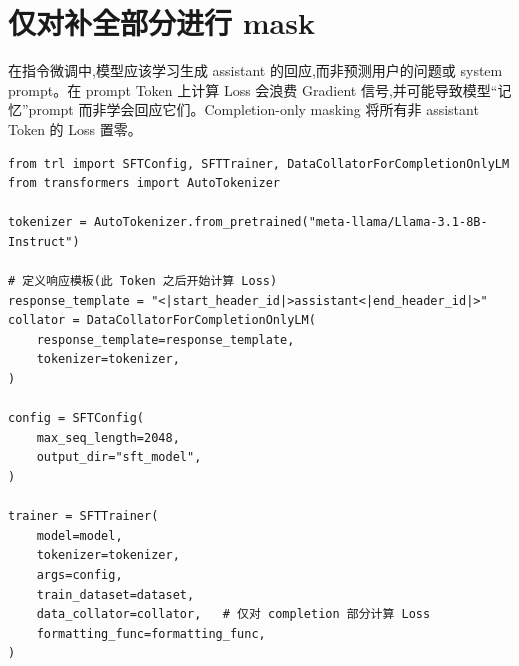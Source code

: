 \section{仅对补全部分进行 mask}
\label{sec:completion-masking}

\begin{intuitionbox}[为何要 mask prompt?]
在指令微调中,模型应该学习生成 assistant 的回应,而非预测用户的问题或 system prompt。在 prompt Token 上计算 Loss 会浪费 Gradient 信号,并可能导致模型“记忆”prompt 而非学会回应它们。Completion-only masking 将所有非 assistant Token 的 Loss 置零。
\end{intuitionbox}

\begin{examplebox}
\begin{lstlisting}[style=pythonstyle]
from trl import SFTConfig, SFTTrainer, DataCollatorForCompletionOnlyLM
from transformers import AutoTokenizer

tokenizer = AutoTokenizer.from_pretrained("meta-llama/Llama-3.1-8B-Instruct")

# 定义响应模板(此 Token 之后开始计算 Loss)
response_template = "<|start_header_id|>assistant<|end_header_id|>"
collator = DataCollatorForCompletionOnlyLM(
    response_template=response_template,
    tokenizer=tokenizer,
)

config = SFTConfig(
    max_seq_length=2048,
    output_dir="sft_model",
)

trainer = SFTTrainer(
    model=model,
    tokenizer=tokenizer,
    args=config,
    train_dataset=dataset,
    data_collator=collator,   # 仅对 completion 部分计算 Loss
    formatting_func=formatting_func,
)
\end{lstlisting}
\end{examplebox}

